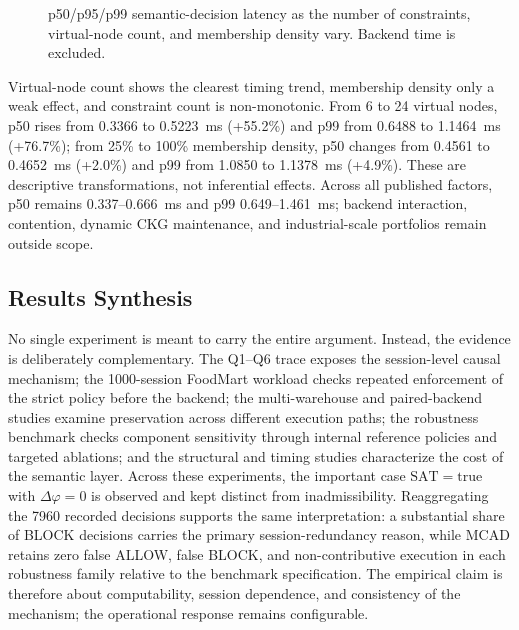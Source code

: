 \documentclass[journal]{IEEEtran}
\begin{document}


\begin{figure}[!t]
\centering
\begin{minipage}[t]{0.32\textwidth}\centering\end{minipage}\hfill
\begin{minipage}[t]{0.32\textwidth}\centering\end{minipage}\hfill
\begin{minipage}[t]{0.32\textwidth}\centering\end{minipage}
\caption{p50/p95/p99 semantic-decision latency as the number of constraints, virtual-node count, and membership density vary. Backend time is excluded.}
\label{fig:semantic-latency}
\end{figure}

Virtual-node count shows the clearest timing trend, membership density only a weak effect, and constraint count is non-monotonic. From 6 to 24 virtual nodes, p50 rises from 0.3366 to 0.5223~ms (+55.2\%) and p99 from 0.6488 to 1.1464~ms (+76.7\%); from 25\% to 100\% membership density, p50 changes from 0.4561 to 0.4652~ms (+2.0\%) and p99 from 1.0850 to 1.1378~ms (+4.9\%). These are descriptive transformations, not inferential effects. Across all published factors, p50 remains 0.337--0.666~ms and p99 0.649--1.461~ms; backend interaction, contention, dynamic CKG maintenance, and industrial-scale portfolios remain outside scope.

\subsection{Results Synthesis}

No single experiment is meant to carry the entire argument. Instead, the evidence is deliberately complementary. The Q1--Q6 trace exposes the session-level causal mechanism; the 1000-session FoodMart workload checks repeated enforcement of the strict policy before the backend; the multi-warehouse and paired-backend studies examine preservation across different execution paths; the robustness benchmark checks component sensitivity through internal reference policies and targeted ablations; and the structural and timing studies characterize the cost of the semantic layer. Across these experiments, the important case $\mathrm{SAT}=\mathrm{true}$ with $\Delta\varphi=0$ is observed and kept distinct from inadmissibility. Reaggregating the 7960 recorded decisions supports the same interpretation: a substantial share of BLOCK decisions carries the primary session-redundancy reason, while MCAD retains zero false ALLOW, false BLOCK, and non-contributive execution in each robustness family relative to the benchmark specification. The empirical claim is therefore about computability, session dependence, and consistency of the mechanism; the operational response remains configurable.
\end{document}
